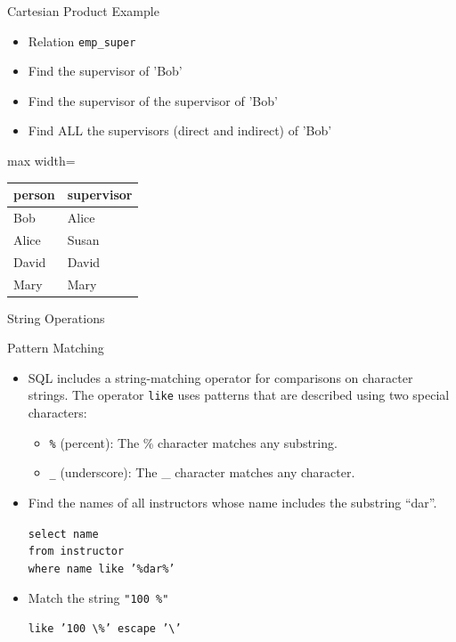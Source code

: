 \documentclass[aspectratio=169, xcolor=dvipsnames]{beamer}
\begin{document}
\begin{frame}{Cartesian Product Example}
    \begin{itemize}
        \item Relation \texttt{emp\_super}
        \item Find the supervisor of 'Bob'
        \item Find the supervisor of the supervisor of 'Bob'
        \item Find ALL the supervisors (direct and indirect) of 'Bob'
    \end{itemize}
    \vspace{1em}
    \begin{center}
        \begin{adjustbox}{max width=\textwidth}
        \begin{tabular}{|l|l|}
        \hline
        \textbf{person} & \textbf{supervisor} \\ \hline
        Bob & Alice \\ \hline
        Alice & Susan \\ \hline
        David & David \\ \hline
        Mary & Mary \\ \hline
        \end{tabular}
        \end{adjustbox}
    \end{center}
\end{frame}

\begin{frame}{String Operations}
    \begin{block}{Pattern Matching}
        \begin{itemize}[<+->]
            \item SQL includes a string-matching operator for comparisons on character strings. The operator \texttt{like} uses patterns that are described using two special characters:
            \begin{itemize}
                \item[$\triangleright$] \texttt{\%} (percent): The \% character matches any substring.
                \item[$\triangleright$] \texttt{\_} (underscore): The \_ character matches any character.
            \end{itemize}
            \item Find the names of all instructors whose name includes the substring ``dar''.
            \begin{center}
                \texttt{select name \\
                        from instructor \\
                        where name like '\%dar\%'}
            \end{center}
            \item Match the string \texttt{"100 \%"}
            \begin{center}
                \texttt{like '100 \textbackslash\%' escape '\textbackslash'}
            \end{center}
        \end{itemize}
    \end{block}
\end{frame}
\end{document}

